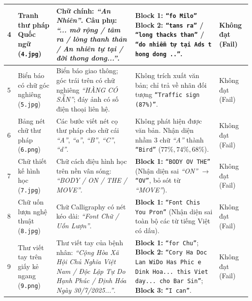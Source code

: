 \documentclass[11pt,a4paper]{article}
\begin{document}
{\begin{longtable}{@{}C{0.7cm} L{2.7cm} L{4.6cm} L{5.7cm} C{1.6cm}@{}}
4 & Tranh thư pháp Quốc ngữ (\texttt{4.jpg}) &
Chữ chính: \textit{``An Nhiên''}. Câu phụ: \textit{``... mở rộng / tâm ra / lòng thanh thản / An nhiên tự tại / đời thong dong...''}. &
\textbf{Block 1:} \texttt{``fo Milo''} \newline
\textbf{Block 2:} \texttt{``tans ra''} / \texttt{``long thacks than''} / \texttt{``do nhiễm tự tại Ads t hong dong ..''}. &
Không đạt \newline (Fail) \\
\midrule

5 & Biển báo có chữ góc nghiêng (\texttt{5.jpg}) &
Biển báo giao thông; góc trái trên có chữ nghiêng \textit{``HÀNG CÓ SẴN''}; đáy ảnh có số điện thoại liên hệ. &
Không trích xuất văn bản; chỉ trả về nhãn đối tượng \texttt{``Traffic sign (87\%)''}. &
Không đạt \newline (Fail) \\
\midrule

6 & Bảng nét chữ thư pháp (\texttt{6.png}) &
Các bước viết nét cọ thư pháp cho chữ cái \textit{``A''}, \textit{``a''}, \textit{``B''}, \textit{``C''}, \textit{``d''}. &
Không phát hiện được văn bản. Nhận diện nhầm 3 chữ \textit{``A''} thành \texttt{``Bird''} ($77\%, 74\%, 68\%$). &
Không đạt \newline (Fail) \\
\midrule

7 & Chữ thiết kế hình học (\texttt{7.jpg}) &
Chữ cách điệu hình học trên nền vân sóng: \textit{``BODY / ON / THE / MOVE''}. &
\textbf{Block 1:} \texttt{``BODY OV THE''} \newline
(Nhận diện sai \textit{``ON''} $\rightarrow$ \texttt{``OV''}, bỏ sót từ \textit{``MOVE''}). &
Không đạt \newline (Fail) \\
\midrule

8 & Chữ uốn lượn nghệ thuật (\texttt{8.jpg}) &
Chữ Calligraphy có nét kéo dài: \textit{``Font Chữ / Uốn Lượn''}. &
\textbf{Block 1:} \texttt{``Font Chis You Pron''} \newline
(Nhận diện sai toàn bộ các từ tiếng Việt có dấu). &
Không đạt \newline (Fail) \\
\midrule

9 & Thư viết tay trên giấy kẻ ngang (\texttt{9.png}) &
Thư viết tay của bệnh nhân: \textit{``Cộng Hòa Xã Hội Chủ Nghĩa Việt Nam / Độc Lập Tự Do Hạnh Phúc / Định Hóa Ngày 30/7/2025...''}. &
\textbf{Block 1:} \texttt{``for Chu''}; \textbf{Block 2:} \texttt{``Cory Ha Doc Lan WiDo Has Phic e Dink Hoa... this Viet day... cho Bar Sin''}; \textbf{Block 3:} \texttt{``I can''}. &
Không đạt \newline (Fail) \\
\midrule


\end{longtable}}
\end{document}
